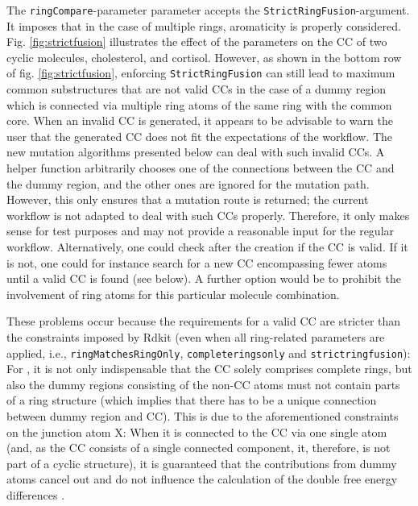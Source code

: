 The \texttt{ringCompare}-parameter parameter accepts the \texttt{StrictRingFusion}-argument.
It imposes that in the case of multiple rings, aromaticity is properly
considered. Fig. \ref{fig:strictfusion} illustrates the effect of the parameters
on the CC of two cyclic molecules, cholesterol, and cortisol. However, as shown in the bottom row of fig. \ref{fig:strictfusion}, enforcing
\texttt{StrictRingFusion} can still lead to maximum common substructures
that are not valid {\trafo} CCs in the case of a dummy region
which is connected via multiple ring atoms of the same ring with the common
core. 
When an invalid CC is generated, it appears to be advisable to warn the user that the generated CC does not fit the expectations of the {\trafo} workflow. 
The new mutation algorithms presented below can deal with such invalid CCs. A helper function arbitrarily chooses one of the connections between the CC and the dummy region, and the other ones are ignored for the mutation path. However, this only ensures that a mutation route is returned; the current {\trafo} workflow is not adapted to deal with such CCs properly. Therefore, it only makes sense for test purposes and may not provide a reasonable input for the regular workflow.
Alternatively, one could check after the creation if the CC is valid. If
it is not, one could for instance search for a new CC encompassing fewer
atoms until a valid CC is found (see below). A further option would be to prohibit the involvement of ring atoms for this particular molecule combination.

These problems occur because the requirements for a valid {\trafo} CC are stricter than the constraints imposed by Rdkit  (even when all ring-related parameters are applied, i.e., \texttt{ringMatchesRingOnly}, \texttt{completeringsonly} and \texttt{strictringfusion}): For {\trafo}, it is not only indispensable that the CC solely comprises complete rings, but also the dummy regions consisting of the non-CC atoms must not contain parts of a ring structure (which implies that there has to be a unique connection between dummy region and CC). This is due to the aforementioned constraints on the junction atom X: When it is connected to the CC via one single atom (and, as the CC consists of a single connected component, it, therefore, is not part of a cyclic structure), it is guaranteed that the contributions from dummy atoms cancel out and do not influence the calculation of the double free energy differences \cite{Karwounopoulos.2022}.

